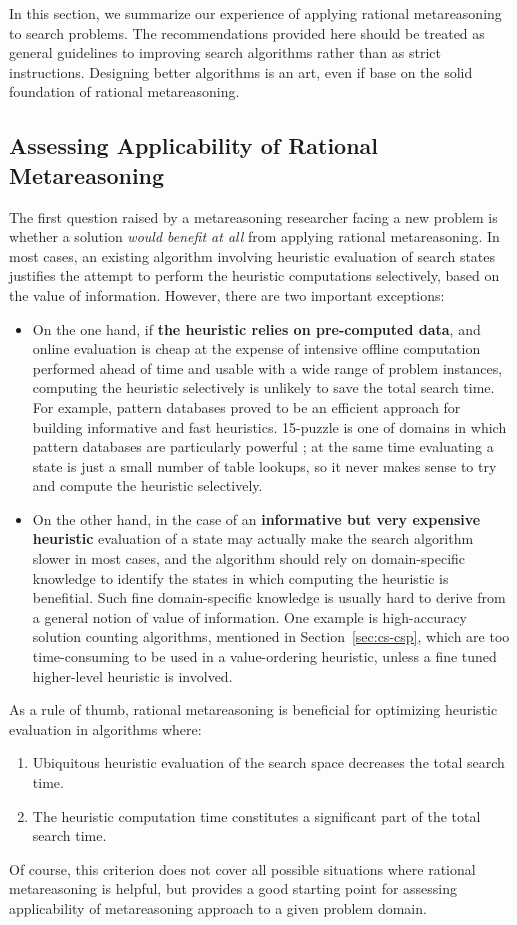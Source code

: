 In this section, we summarize our experience of applying rational
metareasoning to search problems. The recommendations provided here
should be treated as general guidelines to improving search algorithms
rather than as strict instructions. Designing better algorithms is 
an art, even if base on the solid foundation of rational
metareasoning.

\subsection{Assessing Applicability of Rational Metareasoning}

The first question raised by a metareasoning researcher facing a new
problem is whether a solution \emph{would benefit at all} from
applying rational metareasoning. In most cases, an existing algorithm
involving heuristic evaluation of search states justifies the attempt
to perform the heuristic computations selectively, based on the value
of information. However, there are two important exceptions:
\begin{itemize}
\item On the one hand, if \textbf{the heuristic relies on pre-computed
  data}, and online evaluation is cheap at the expense of intensive
  offline computation performed ahead of time and usable with a wide
  range of problem instances, computing the heuristic selectively is
  unlikely to save the total search time. For example, pattern
  databases \cite{pattern} proved to be an efficient approach for
  building informative and fast heuristics. 15-puzzle is one of
  domains in which pattern databases are particularly powerful
  \cite{Felner.apdb}; at the same time evaluating a state is just a
  small number of table lookups, so it never makes sense to try and
  compute the heuristic selectively.
\item On the other hand, in the case of an \textbf{informative but
  very expensive heuristic} evaluation of a state may
  actually make the search algorithm slower in most cases, and the
  algorithm should rely on domain-specific knowledge to
  identify the states in which computing the heuristic is benefitial. 
  Such fine domain-specific knowledge is usually hard to derive from
  a general notion of value of information. One example is
  high-accuracy solution counting algorithms, mentioned in
  Section~\ref{sec:cs-csp}, which are too time-consuming to be used
  in a value-ordering heuristic, unless a fine tuned higher-level
  heuristic is involved.
\end{itemize}
As a rule of thumb, rational metareasoning is beneficial for
optimizing heuristic evaluation in algorithms where:
\begin{enumerate}
\item Ubiquitous heuristic evaluation of the search space decreases the total search
  time.
\item The heuristic computation time constitutes a significant part of
  the total search time. 
\end{enumerate}
Of course, this criterion does not cover all possible situations where
rational metareasoning is helpful, but provides a good starting point
for assessing applicability of metareasoning approach to a given
problem domain.

